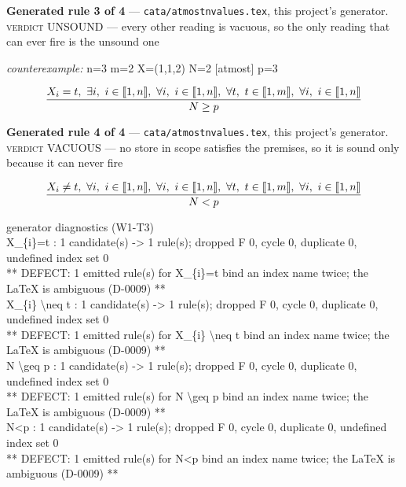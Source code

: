 \documentclass[10pt,a4paper]{article}
\newcommand{\diag}[1]{{\small\itshape\raggedright #1\par}}
\newcommand{\rulebox}[1]{%
  \[\resizebox{\ifdim\width>\linewidth\linewidth\else\width\fi}{!}%
    {$\displaystyle #1$}\]}
\begin{document}
{\small\textbf{Generated rule 3 of 4} --- \texttt{cata/atmostnvalues.tex}, this project's generator. \textsc{verdict} UNSOUND --- every other reading is vacuous, so the only reading that can ever fire is the unsound one\par}
{\small\textit{counterexample:} n=3 m=2 X=(1,1,2) N=2 [atmost] p=3\par}
\rulebox{\frac{X_{i}=t,~\exists i,~i \in \llbracket1,n\rrbracket,~\forall i,~i \in \llbracket1,n\rrbracket,~\forall t,~t \in \llbracket1,m\rrbracket,~\forall i,~i \in \llbracket1,n\rrbracket}{N \geq p}}

{\small\textbf{Generated rule 4 of 4} --- \texttt{cata/atmostnvalues.tex}, this project's generator. \textsc{verdict} VACUOUS --- no store in scope satisfies the premises, so it is sound only because it can never fire\par}
\rulebox{\frac{X_{i} \neq t,~\forall i,~i \in \llbracket1,n\rrbracket,~\forall i,~i \in \llbracket1,n\rrbracket,~\forall t,~t \in \llbracket1,m\rrbracket,~\forall i,~i \in \llbracket1,n\rrbracket}{N<p}}

\diag{generator diagnostics (W1-T3)\\{} X\_\{i\}=t : 1 candidate(s) -> 1 rule(s); dropped F 0, cycle 0, duplicate 0, undefined index set 0\\{}   ** DEFECT: 1 emitted rule(s) for X\_\{i\}=t bind an index name twice; the LaTeX is ambiguous (D-0009) **\\{} X\_\{i\} \textbackslash{}neq t : 1 candidate(s) -> 1 rule(s); dropped F 0, cycle 0, duplicate 0, undefined index set 0\\{}   ** DEFECT: 1 emitted rule(s) for X\_\{i\} \textbackslash{}neq t bind an index name twice; the LaTeX is ambiguous (D-0009) **\\{} N \textbackslash{}geq p : 1 candidate(s) -> 1 rule(s); dropped F 0, cycle 0, duplicate 0, undefined index set 0\\{}   ** DEFECT: 1 emitted rule(s) for N \textbackslash{}geq p bind an index name twice; the LaTeX is ambiguous (D-0009) **\\{} N<p : 1 candidate(s) -> 1 rule(s); dropped F 0, cycle 0, duplicate 0, undefined index set 0\\{}   ** DEFECT: 1 emitted rule(s) for N<p bind an index name twice; the LaTeX is ambiguous (D-0009) **}
\end{document}
